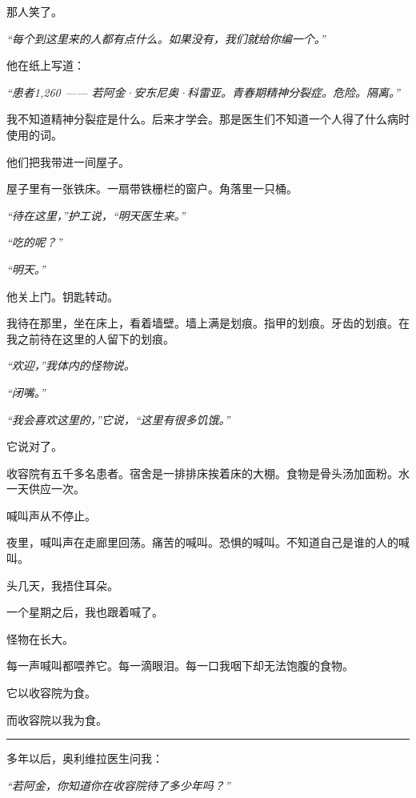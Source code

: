 \noindent 那人笑了。

\noindent \textit{“每个到这里来的人都有点什么。如果没有，我们就给你编一个。”}

\noindent 他在纸上写道：

\noindent \textit{“患者1,260 —— 若阿金·安东尼奥·科雷亚。青春期精神分裂症。危险。隔离。”}

\noindent 我不知道精神分裂症是什么。后来才学会。那是医生们不知道一个人得了什么病时使用的词。

\noindent 他们把我带进一间屋子。

\noindent 屋子里有一张铁床。一扇带铁栅栏的窗户。角落里一只桶。

\noindent \textit{“待在这里，”护工说，“明天医生来。”}

\noindent \textit{“吃的呢？”}

\noindent \textit{“明天。”}

\noindent 他关上门。钥匙转动。

\noindent 我待在那里，坐在床上，看着墙壁。墙上满是划痕。指甲的划痕。牙齿的划痕。在我之前待在这里的人留下的划痕。

\noindent \textit{“欢迎，”我体内的怪物说。}

\noindent \textit{“闭嘴。”}

\noindent \textit{“我会喜欢这里的，”它说，“这里有很多饥饿。”}

\noindent 它说对了。

\noindent 收容院有五千多名患者。宿舍是一排排床挨着床的大棚。食物是骨头汤加面粉。水一天供应一次。

\noindent 喊叫声从不停止。

\noindent 夜里，喊叫声在走廊里回荡。痛苦的喊叫。恐惧的喊叫。不知道自己是谁的人的喊叫。

\noindent 头几天，我捂住耳朵。

\noindent 一个星期之后，我也跟着喊了。

\noindent 怪物在长大。

\noindent 每一声喊叫都喂养它。每一滴眼泪。每一口我咽下却无法饱腹的食物。

\noindent 它以收容院为食。

\noindent 而收容院以我为食。

\vspace{0.5em}\noindent\rule{\textwidth}{0.5pt}\vspace{0.5em}

\noindent 多年以后，奥利维拉医生问我：

\noindent \textit{“若阿金，你知道你在收容院待了多少年吗？”}

